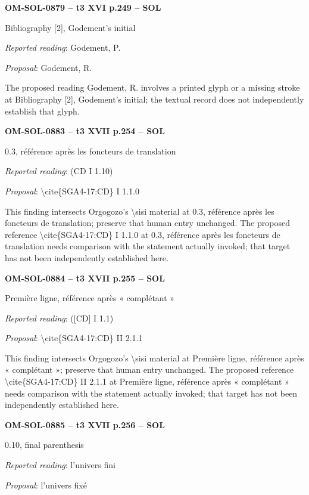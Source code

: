 \par\noindent\textbf{OM-SOL-0879 -- t3 XVI p.249 -- SOL}\par
Bibliography [2], Godement's initial\par
\emph{Reported reading}: Godement, P.\par
\emph{Proposal}: Godement, R.\par
The proposed reading Godement, R. involves a printed glyph or a missing stroke at Bibliography [2], Godement's initial; the textual record does not independently establish that glyph.\par
\par\noindent\textbf{OM-SOL-0883 -- t3 XVII p.254 -- SOL}\par
0.3, référence après les foncteurs de translation\par
\emph{Reported reading}: (CD I 1.10)\par
\emph{Proposal}: \textbackslash{}cite\{SGA4-17:CD\} I 1.1.0\par
This finding intersects Orgogozo's \textbackslash{}sisi material at 0.3, référence après les foncteurs de translation; preserve that human entry unchanged. The proposed reference \textbackslash{}cite\{SGA4-17:CD\} I 1.1.0 at 0.3, référence après les foncteurs de translation needs comparison with the statement actually invoked; that target has not been independently established here.\par
\par\noindent\textbf{OM-SOL-0884 -- t3 XVII p.255 -- SOL}\par
Première ligne, référence après « complétant »\par
\emph{Reported reading}: ([CD] I 1.1)\par
\emph{Proposal}: \textbackslash{}cite\{SGA4-17:CD\} II 2.1.1\par
This finding intersects Orgogozo's \textbackslash{}sisi material at Première ligne, référence après « complétant »; preserve that human entry unchanged. The proposed reference \textbackslash{}cite\{SGA4-17:CD\} II 2.1.1 at Première ligne, référence après « complétant » needs comparison with the statement actually invoked; that target has not been independently established here.\par
\par\noindent\textbf{OM-SOL-0885 -- t3 XVII p.256 -- SOL}\par
0.10, final parenthesis\par
\emph{Reported reading}: l'univers fini\par
\emph{Proposal}: l'univers fixé\par
